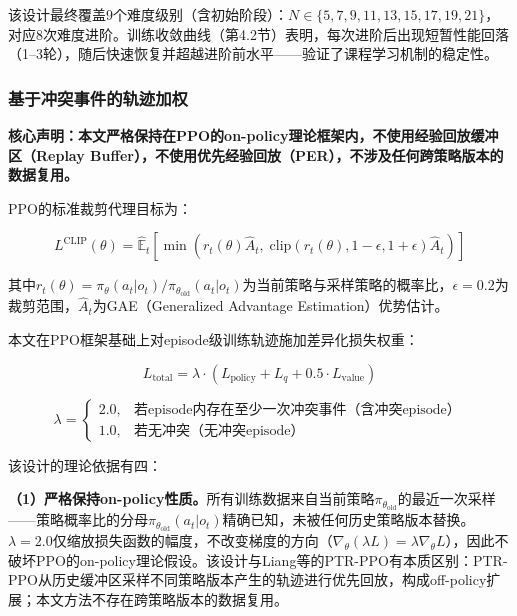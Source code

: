 \documentclass[12pt,a4paper,UTF8]{ctexart}
\begin{document}
该设计最终覆盖9个难度级别（含初始阶段）：$N \in \{5, 7, 9, 11, 13, 15, 17, 19, 21\}$，对应8次难度进阶。训练收敛曲线（第4.2节）表明，每次进阶后出现短暂性能回落（1--3轮），随后快速恢复并超越进阶前水平——验证了课程学习机制的稳定性。

\subsubsection{基于冲突事件的轨迹加权}

\textbf{核心声明：本文严格保持在PPO的on-policy理论框架内，不使用经验回放缓冲区（Replay Buffer），不使用优先经验回放（PER），不涉及任何跨策略版本的数据复用。}

PPO的标准裁剪代理目标为：

\begin{equation}
    L^{\text{CLIP}}(\theta) = \hat{\mathbb{E}}_t\left[\min\left(r_t(\theta)\hat{A}_t,\; \text{clip}(r_t(\theta), 1-\epsilon, 1+\epsilon)\hat{A}_t\right)\right]
\end{equation}

其中$r_t(\theta) = \pi_\theta(a_t|o_t) / \pi_{\theta_{\text{old}}}(a_t|o_t)$为当前策略与采样策略的概率比，$\epsilon = 0.2$为裁剪范围，$\hat{A}_t$为GAE（Generalized Advantage Estimation）优势估计。

本文在PPO框架基础上对episode级训练轨迹施加差异化损失权重：

\begin{equation}
    L_{\text{total}} = \lambda \cdot \left(L_{\text{policy}} + L_{q} + 0.5 \cdot L_{\text{value}}\right)
\end{equation}

\begin{equation}
    \lambda = \begin{cases}
        2.0, & \text{若episode内存在至少一次冲突事件（含冲突episode）} \\
        1.0, & \text{若无冲突（无冲突episode）}
    \end{cases}
\end{equation}

该设计的理论依据有四：

\textbf{（1）严格保持on-policy性质。}所有训练数据来自当前策略$\pi_{\theta_{\text{old}}}$的最近一次采样——策略概率比的分母$\pi_{\theta_{\text{old}}}(a_t|o_t)$精确已知，未被任何历史策略版本替换。$\lambda=2.0$仅缩放损失函数的幅度，不改变梯度的方向（$\nabla_\theta (\lambda L) = \lambda \nabla_\theta L$），因此不破坏PPO的on-policy理论假设。该设计与Liang等的PTR-PPO\cite{ref21}有本质区别：PTR-PPO从历史缓冲区采样不同策略版本产生的轨迹进行优先回放，构成off-policy扩展；本文方法不存在跨策略版本的数据复用。
\end{document}
